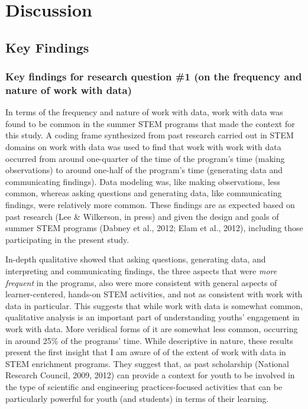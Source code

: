 \documentclass[]{msu-thesis}
\theoremstyle{definition}
\theoremstyle{definition}
\theoremstyle{definition}
\theoremstyle{remark}
\begin{document}
\chapter{Discussion}\label{discussion}

\section{Key Findings}\label{key-findings}

\subsection{Key findings for research question \#1 (on the frequency and
nature of work with
data)}\label{key-findings-for-research-question-1-on-the-frequency-and-nature-of-work-with-data}

In terms of the frequency and nature of work with data, work with data
was found to be common in the summer STEM programs that made the context
for this study. A coding frame synthesized from past research carried
out in STEM domains on work with data was used to find that work with
work with data occurred from around one-quarter of the time of the
program's time (making observations) to around one-half of the program's
time (generating data and communicating findings). Data modeling was,
like making observations, less common, whereas asking questions and
generating data, like communicating findings, were relatively more
common. These findings are as expected based on past research (Lee \&
Wilkerson, in press) and given the design and goals of summer STEM
programs (Dabney et al., 2012; Elam et al., 2012), including those
participating in the present study.

In-depth qualitative showed that asking questions, generating data, and
interpreting and communicating findings, the three aspects that were
\emph{more frequent} in the programs, also were more consistent with
general aspects of learner-centered, hands-on STEM activities, and not
as consistent with work with data in particular. This suggests that
while work with data is somewhat common, qualitative analysis is an
important part of understanding youths' engagement in work with data.
More veridical forms of it are somewhat less common, occurring in around
25\% of the programs' time. While descriptive in nature, these results
present the first insight that I am aware of of the extent of work with
data in STEM enrichment programs. They suggest that, as past scholarship
(National Research Council, 2009, 2012) can provide a context for youth
to be involved in the type of scientific and engineering
practices-focused activities that can be particularly powerful for youth
(and students) in terms of their learning.
\end{document}
